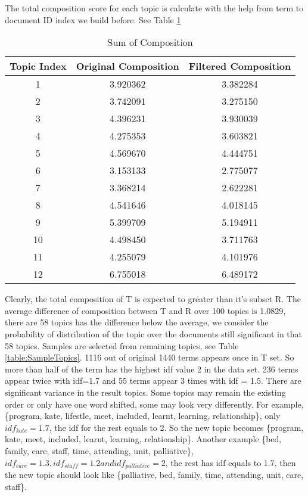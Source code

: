 \documentclass[11pt,twoside]{report}
\begin{document}
The total composition score for each topic is calculate with the help from term to document ID index we build before. See Table \ref{table:SumComposition}

\begin{table}[h]
\caption{Sum of Composition}
\centering
\begin{tabular}{c c c}
\hline\hline
Topic Index & Original Composition & Filtered Composition\\
\hline
1 & 3.920362 & 3.382284\\
2 & 3.742091 & 3.275150\\
3 & 4.396231 & 3.930039\\
4 & 4.275353 & 3.603821\\
5 & 4.569670 & 4.444751\\
6 & 3.153133 & 2.775077\\
7 & 3.368214 & 2.622281\\
8 & 4.541646 & 4.018145\\
9 & 5.399709 & 5.194911\\
10 & 4.498450 & 3.711763\\
11 & 4.255079 & 4.101976\\
12 & 6.755018 & 6.489172\\
\hline
\end{tabular}
\label{table:SumComposition}
\end{table}

Clearly, the total composition of T is expected to greater than it's subset R. The average difference of composition between T and R over 100 topics is 1.0829, there are 58 topics has the difference below the average, we consider the probability of distribution of the topic over the documents still significant in that 58 topics. Samples are selected from remaining topics, see Table \ref{table:SampleTopics}. 
1116 out of original 1440 terms appears once in T set. So more than half of the term has the highest idf value 2 in the data set. 236 terms appear twice with idf=1.7 and 55 terms appear 3 times with idf = 1.5. There are significant variance in the result topics. Some topics may remain the existing order or only have one word shifted, some may look very differently.  For example, \{program, kate, lifestle, meet, included, learnt, learning, relationship\}, only $idf_{kate} = 1.7$, the idf for the rest equals to 2. So the new topic becomes \{program, kate, meet, included, learnt, learning, relationship\}. Another example \{bed, family, care, staff, time, attending, unit, palliative\}, $idf_{care}=1.3, idf_{staff}=1.2 and idf_{palliative}=2$, the rest has idf equals to 1.7, then the new topic should look like \{palliative, bed, family, time, attending, unit, care, staff\}. 
\end{document}
